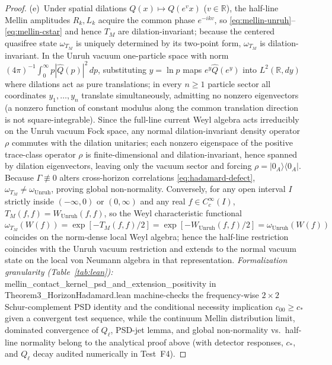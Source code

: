 \documentclass[11pt,a4paper]{article}
\theoremstyle{definition}
\theoremstyle{remark}
\newcommand{\bbR}{\mathbb{R}}
\newcommand{\1}{\mathbf{1}}
\newcommand{\code}[1]{{\scriptsize\ttfamily #1}}
\begin{document}
\begin{proof}
(e)~Under spatial dilations $Q(x)\mapsto Q(e^v x)$ ($v\in\bbR$), the half-line Mellin amplitudes $R_k, L_k$ acquire the common phase $e^{-ikv}$, so \eqref{eq:mellin-unruh}--\eqref{eq:mellin-cstar} and hence $T_M$ are dilation-invariant; because the centered quasifree state $\omega_{T_M}$ is uniquely determined by its two-point form, $\omega_{T_M}$ is dilation-invariant. In the Unruh vacuum one-particle space with norm $(4\pi)^{-1}\int_0^\infty p|\widehat{Q}(p)|^2\,dp$, substituting $y=\ln p$ maps $e^y\widehat{Q}(e^y)$ into $L^2(\bbR,dy)$ where dilations act as pure translations; in every $n\ge 1$ particle sector all coordinates $y_1,\dots,y_n$ translate simultaneously, admitting no nonzero eigenvectors (a nonzero function of constant modulus along the common translation direction is not square-integrable). Since the full-line current Weyl algebra acts irreducibly on the Unruh vacuum Fock space, any normal dilation-invariant density operator $\rho$ commutes with the dilation unitaries; each nonzero eigenspace of the positive trace-class operator $\rho$ is finite-dimensional and dilation-invariant, hence spanned by dilation eigenvectors, leaving only the vacuum sector and forcing $\rho = |0_A\rangle\langle 0_A|$. Because $\Gamma\not\equiv 0$ alters cross-horizon correlations \eqref{eq:hadamard-defect}, $\omega_{T_M}\neq \omega_{\mathrm{Unruh}}$, proving global non-normality. Conversely, for any open interval $I$ strictly inside $(-\infty,0)$ or $(0,\infty)$ and any real $f\in C_c^\infty(I)$, $T_M(f,f)=W_{\mathrm{Unruh}}(f,f)$, so the Weyl characteristic functional $\omega_{T_M}(W(f))=\exp[-T_M(f,f)/2]=\exp[-W_{\mathrm{Unruh}}(f,f)/2]=\omega_{\mathrm{Unruh}}(W(f))$ coincides on the norm-dense local Weyl algebra; hence the half-line restriction coincides with the Unruh vacuum restriction and extends to the normal vacuum state on the local von Neumann algebra in that representation.
\emph{Formalization granularity (Table~\ref{tab:lean}):} \code{mellin\_\allowbreak contact\_\allowbreak kernel\_\allowbreak psd\_\allowbreak and\_\allowbreak extension\_\allowbreak positivity} in \code{Theorem3\_\allowbreak Horizon\allowbreak Hadamard.lean} machine-checks the frequency-wise $2\times 2$ Schur-complement PSD identity and the conditional necessity implication $c_{00}\ge c_*$ given a convergent test sequence, while the continuum Mellin distribution limit, dominated convergence of $Q_\ell$, PSD-jet lemma, and global non-normality vs.\ half-line normality belong to the analytical proof above (with detector responses, $c_*$, and $Q_\ell$ decay audited numerically in Test~F4).
\end{proof}
\end{document}
